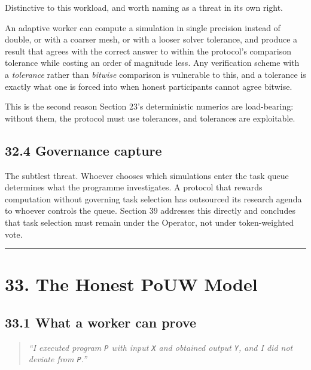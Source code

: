 \documentclass[
  11pt]{report}
\begin{document}
Distinctive to this workload, and worth naming as a threat in its own
right.

An adaptive worker can compute a simulation in single precision instead
of double, or with a coarser mesh, or with a looser solver tolerance,
and produce a result that agrees with the correct answer to within the
protocol's comparison tolerance while costing an order of magnitude
less. Any verification scheme with a \emph{tolerance} rather than
\emph{bitwise} comparison is vulnerable to this, and a tolerance is
exactly what one is forced into when honest participants cannot agree
bitwise.

This is the second reason Section 23's deterministic numerics are
load-bearing: without them, the protocol must use tolerances, and
tolerances are exploitable.

\hypertarget{governance-capture}{%
\section{32.4 Governance capture}\label{governance-capture}}

The subtlest threat. Whoever chooses which simulations enter the task
queue determines what the programme investigates. A protocol that
rewards computation without governing task selection has outsourced its
research agenda to whoever controls the queue. Section 39 addresses this
directly and concludes that task selection must remain under the
Operator, not under token-weighted vote.

\begin{center}\rule{0.5\linewidth}{0.5pt}\end{center}

\hypertarget{the-honest-pouw-model}{%
\chapter{33. The Honest PoUW Model}\label{the-honest-pouw-model}}

\hypertarget{what-a-worker-can-prove}{%
\section{33.1 What a worker can prove}\label{what-a-worker-can-prove}}

\begin{quote}
\emph{``I executed program \texttt{P} with input \texttt{X} and obtained
output \texttt{Y}, and I did not deviate from \texttt{P}.''}
\end{quote}
\end{document}
